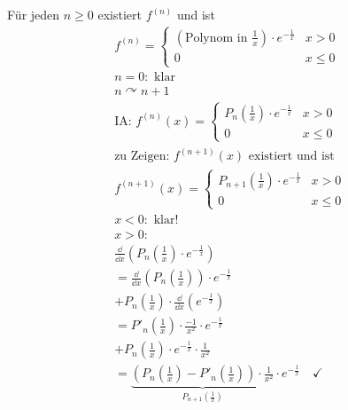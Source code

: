 \begin{bsp*}
	\begin{bem}
		\begin{bew}
			\begin{beh}
				Für jeden $n \geq 0$ existiert $f^{(n)}$ und ist
				\begin{gather*}
					f^{(n)} = \begin{cases}
						\left( \text{Polynom in } \frac{1}{x} \right) \cdot e^{-\frac{1}{x}}	&x > 0	\\
						0												&x \leq 0	
					\end{cases} \\
					n = 0 : \text{ klar} \\
					n \curvearrowright n+1 \\
					\text{IA: } f^{(n)}(x) = \begin{cases}
						P_n\left( \frac{1}{x} \right) \cdot e^{-\frac{1}{x}}	&x > 0	\\
						0									&x \leq 0	
					\end{cases} \\
					\text{zu Zeigen: } f^{(n+1)}(x) \text{ existiert und ist } \\
					 f^{(n+1)}(x) = \begin{cases}
						P_{n+1}\left( \frac{1}{x} \right) \cdot e^{-\frac{1}{x}}	&x > 0	\\
						0										&x \leq 0	
					\end{cases} \\
					x < 0 : \text{ klar!} \\
					x > 0 : \\
					\frac{\dd}{\dd x} \left( P_n\left( \frac{1}{x} \right) \cdot e^{-\frac{1}{x}} \right) \\
					= \frac{\dd}{\dd x} \left( P_n\left( \frac{1}{x} \right) \right) \cdot e^{-\frac{1}{x}} \\
					+  P_n\left( \frac{1}{x} \right) \cdot \frac{\dd}{\dd x} \left( e^{-\frac{1}{x}} \right) \\
					= P'_n\left( \frac{1}{x} \right) \cdot \frac{-1}{x^2} \cdot e^{-\frac{1}{x}} \\
					+ P_n\left( \frac{1}{x} \right) \cdot e^{-\frac{1}{x}} \cdot \frac{1}{x^2} \\
					= \underbrace{ \left(  P_n\left( \frac{1}{x} \right) - P'_n\left( \frac{1}{x} \right) \right) \cdot \frac{1}{x^2}}_{P_{n+1}\left( \frac{1}{x} \right) } \cdot e^{-\frac{1}{x}} \quad \checkmark
				\end{gather*}
			\end{beh}
		\end{bew}
	\end{bem}
\end{bsp*}

